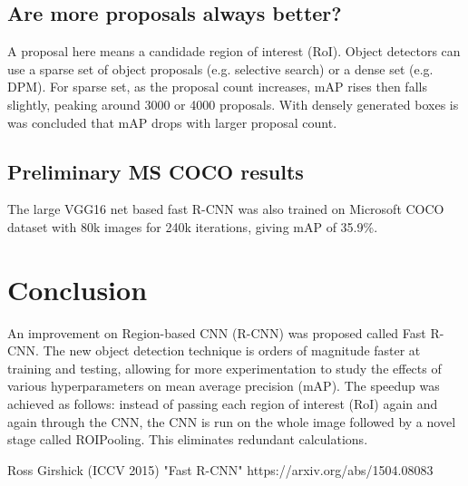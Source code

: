 \documentclass[10pt]{article}
\begin{document}
\subsection{Are more proposals always better?}
A proposal here means a candidade region of interest (RoI). Object detectors can use a sparse set of object proposals (e.g. selective search) or a dense set (e.g. DPM). For sparse set, as the proposal count increases, mAP rises then falls slightly, peaking around 3000 or 4000 proposals. With densely generated boxes is was concluded that mAP drops with larger proposal count.

\subsection{Preliminary MS COCO results}
The large VGG16 net based fast R-CNN was also trained on Microsoft COCO dataset with 80k images for 240k iterations, giving mAP of 35.9\%.


\section{Conclusion}
An improvement on Region-based CNN (R-CNN) was proposed called Fast R-CNN. The new object detection technique is orders of magnitude faster at training and testing, allowing for more experimentation to study the effects of various hyperparameters on mean average precision (mAP). The speedup was achieved as follows: instead of passing each region of interest (RoI) again and again through the CNN, the CNN is run on the whole image followed by a novel stage called ROIPooling. This eliminates redundant calculations.


\begin{thebibliography}{9}

Ross Girshick (ICCV 2015) "Fast R-CNN" https://arxiv.org/abs/1504.08083

\end{thebibliography}
\end{document}
